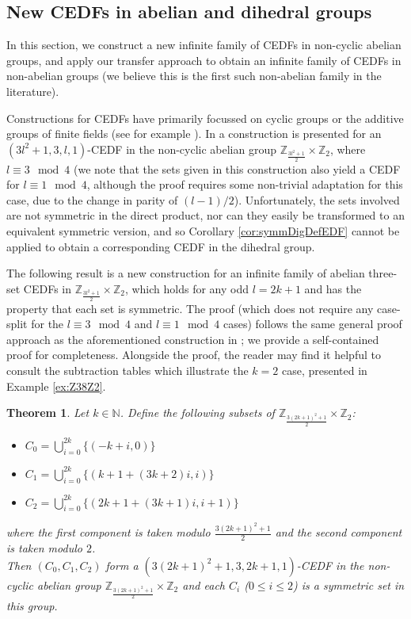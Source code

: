 \documentclass[12pt, a4paper]{article}
\newtheorem{theorem}{Theorem}[section]
\theoremstyle{definition}
\begin{document}
 \subsection{New CEDFs in abelian and dihedral groups}

In this section, we construct a new infinite family of CEDFs in non-cyclic abelian groups, and apply our transfer approach to obtain an infinite family of CEDFs in non-abelian groups (we believe this is the first such non-abelian family in the literature).

Constructions for CEDFs have primarily focussed on cyclic groups or the additive groups of finite fields (see for example \cite{BurMerTra, HucJefMcC, PatSti, StiVei}).
In \cite{HucJefMcC} a construction is presented for an $(3l^2+1,3,l,1)$-CEDF in the non-cyclic abelian group $\mathbb{Z}_{\frac{3l^2+1}{2}}\times\mathbb{Z}_2$, where $l\equiv 3 \mod 4$ (we note that the sets given in this construction also yield a CEDF for $l\equiv 1 \mod 4$, although the proof requires some non-trivial adaptation for this case, due to the change in parity of $(l-1)/2$).  Unfortunately, the sets involved are not symmetric in the direct product, nor can they easily be transformed to an equivalent symmetric version, and so Corollary \ref{cor:symmDigDefEDF} cannot be applied to obtain a corresponding CEDF in the dihedral group.

The following result is a new construction for an infinite family of abelian three-set CEDFs in $\mathbb{Z}_{\frac{3l^2+1}{2}}\times\mathbb{Z}_2$, which holds for any odd $l=2k+1$ and has the property that each set is symmetric.  The proof (which does not require any case-split for the $l\equiv 3 \mod 4$ and $l\equiv 1 \mod 4$ cases) follows the same general proof approach as the aforementioned construction in \cite{HucJefMcC}; we provide a self-contained proof for completeness.  Alongside the proof, the reader may find it helpful to consult the subtraction tables which illustrate the $k=2$ case, presented in Example \ref{ex:Z38Z2}.

\begin{theorem}\label{thm:noncyclic}
Let $k \in \mathbb{N}$. Define the following subsets of $\mathbb{Z}_{\frac{3(2k+1)^2+1}{2}}\times\mathbb{Z}_2$:
\begin{itemize}
\item $C_0=\bigcup_{i=0}^{2k}\{(-k+i,0)\}$
\item $C_1=\bigcup_{i=0}^{2k}\{(k+1+(3k+2)i,i)\}$
\item $C_2=\bigcup_{i=0}^{2k}\{(2k+1+(3k+1)i,i+1)\}$
\end{itemize}
where the first component is taken modulo $\frac{3(2k+1)^2+1}{2}$ and the second component is taken modulo $2$.\\
Then $(C_0,C_1,C_2)$ form a $(3(2k+1)^2+1,3,2k+1,1)$-CEDF in the non-cyclic abelian group $\mathbb{Z}_{\frac{3(2k+1)^2+1}{2}}\times\mathbb{Z}_2$ and each $C_i$ ($0 \leq i \leq 2$) is a symmetric set in this group.
\end{theorem}
\end{document}
